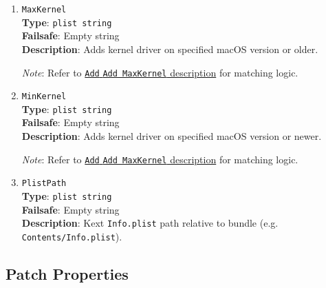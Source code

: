 \documentclass[]{article}
\begin{document}
\begin{enumerate}
\item
  \texttt{MaxKernel}\\
  \textbf{Type}: \texttt{plist\ string}\\
  \textbf{Failsafe}: Empty string\\
  \textbf{Description}: Adds kernel driver on specified macOS version or older.

  \emph{Note}: Refer to \hyperlink{kernmatch}{\texttt{Add} \texttt{Add MaxKernel} description} for matching logic.

\item
  \texttt{MinKernel}\\
  \textbf{Type}: \texttt{plist\ string}\\
  \textbf{Failsafe}: Empty string\\
  \textbf{Description}: Adds kernel driver on specified macOS version or newer.

  \emph{Note}: Refer to \hyperlink{kernmatch}{\texttt{Add} \texttt{Add MaxKernel} description} for matching logic.

\item
  \texttt{PlistPath}\\
  \textbf{Type}: \texttt{plist\ string}\\
  \textbf{Failsafe}: Empty string\\
  \textbf{Description}: Kext \texttt{Info.plist} path relative to bundle
  (e.g. \texttt{Contents/Info.plist}).

\end{enumerate}


\subsection{Patch Properties}\label{kernelpropspatch}
\end{document}
